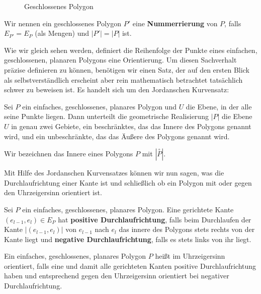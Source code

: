 \begin{figure}[H]
    \centering
    
    \caption{Geschlossenes Polygon}
    \label{fig:polygon-closed}
\end{figure}

\begin{Definition}
Wir nennen  ein geschlossenes Polygon $P'$ eine \textbf{Nummerrierung} von $P$, falls 
$E_{P'} =E_{P}$ (als Mengen) und
$|P'| = |P|$ ist. 
\end{Definition}


Wie wir gleich sehen werden, definiert die Reihenfolge der Punkte eines einfachen, geschlossenen, planaren Polygons eine Orientierung. Um diesen Sachverhalt präzise definieren zu können, benötigen wir einen Satz, der 
auf den ersten Blick als selbstverständlich erscheint aber rein mathematisch betrachtet tatsächlich schwer zu beweisen ist. Es handelt sich um den Jordanschen Kurvensatz:

\begin{Satz}
Sei $P$ ein einfaches, geschlossenes, planares Polygon und $U$ die Ebene, in der alle seine Punkte liegen. 
Dann unterteilt die geometrische Realisierung $|P|$ die Ebene $U$ in genau zwei Gebiete, ein beschränktes, das das Innere des Polygons genannt wird, und ein unbeschränkte, das das Äußere des Polygons genannt wird.
\end{Satz}

\begin{Definition}
Wir bezeichnen das Innere eines Polygons $P$ mit $|\overset{\circ}{P}|$.
\end{Definition}

Mit Hilfe des Jordanschen Kurvensatzes können wir nun sagen, was die Durchlaufrichtung einer Kante ist und schließlich ob ein Polygon mit oder gegen den Uhrzeigersinn orientiert ist.

\begin{Definition}
Sei $P$ ein einfaches, geschlossenes, planares Polygon. Eine gerichtete Kante $(e_{l-1}, e_l) \in E_P$ hat \textbf{positive Durchlaufrichtung}, falls beim Durchlaufen der  Kante $|(e_{l-1}, e_l)|$ von $e_{l-1}$ nach $e_l$ das innere des Polygons stets rechts von der Kante liegt und \textbf{negative Durchlaufrichtung}, falls es stets links von ihr liegt. 
\end{Definition} 
 
\begin{Definition}
Ein einfaches, geschlossenes, planares Polygon $P$ heißt im Uhrzeigersinn orientiert, falls eine und damit alle gerichteten Kanten positive Durchlaufrichtung haben und entsprechend gegen den Uhrzeigersinn orientiert bei negativer Durchlaufrichtung.  
\end{Definition} 

